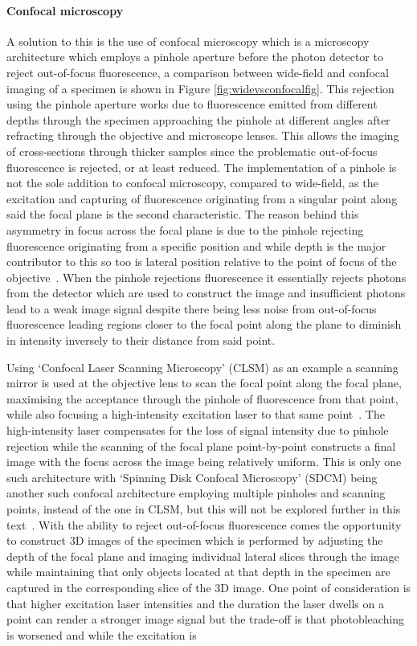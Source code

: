 \paragraph{Confocal microscopy} A solution to this is the use of confocal microscopy which is a microscopy architecture which employs a pinhole aperture before the photon detector to reject out-of-focus fluorescence, a comparison between wide-field and confocal imaging of a specimen is shown in Figure \ref{fig:widevsconfocalfig}. This rejection using the pinhole aperture works due to fluorescence emitted from different depths through the specimen approaching the pinhole at different angles after refracting through the objective and microscope lenses. This allows the imaging of cross-sections through thicker samples since the problematic out-of-focus fluorescence is rejected, or at least reduced. The implementation of a pinhole is not the sole addition to confocal microscopy, compared to wide-field, as the excitation and capturing of fluorescence originating from a singular point along said the focal plane is the second characteristic. The reason behind this asymmetry in focus across the focal plane is due to the pinhole rejecting fluorescence originating from a specific position and while depth is the major contributor to this so too is lateral position relative to the point of focus of the objective~\cite{Confocal-2005, confocal_modern}. When the pinhole rejections fluorescence it essentially rejects photons from the detector which are used to construct the image and insufficient photons lead to a weak image signal despite there being less noise from out-of-focus fluorescence leading regions closer to the focal point along the plane to diminish in intensity inversely to their distance from said point.\par Using `Confocal Laser Scanning Microscopy' (CLSM) as an example a scanning mirror is used at the objective lens to scan the focal point along the focal plane, maximising the acceptance through the pinhole of fluorescence from that point, while also focusing a high-intensity excitation laser to that same point~\cite{confocal_modern}. The high-intensity laser compensates for the loss of signal intensity due to pinhole rejection while the scanning of the focal plane point-by-point constructs a final image with the focus across the image being relatively uniform. This is only one such architecture with `Spinning Disk Confocal Microscopy' (SDCM) being another such confocal architecture employing multiple pinholes and scanning points, instead of the one in CLSM, but this will not be explored further in this text~\cite{Sanderson-2014, Confocal-2005, confocal_modern}. With the ability to reject out-of-focus fluorescence comes the opportunity to construct 3D images of the specimen which is performed by adjusting the depth of the focal plane and imaging individual lateral slices through the image while maintaining that only objects located at that depth in the specimen are captured in the corresponding slice of the 3D image. One point of consideration is that higher excitation laser intensities and the duration the laser dwells on a point can render a stronger image signal but the trade-off is that photobleaching is worsened and while the excitation is 